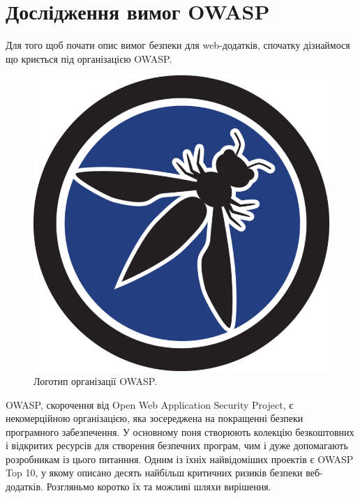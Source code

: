 \chapter{Дослідження вимог OWASP}
Для того щоб почати опис вимог безпеки для web-додатків, спочатку дізнаймося що криється під організацією OWASP.

\begin{figure}[!h]
    		\centering
    		\includegraphics[scale = 0.3]{IMAGES/owasp_logo.png}
    		\caption{Логотип організації OWASP.}
    		\label{fig:app_view_main_screen}
	\end{figure}

OWASP, скорочення від Open Web Application Security Project, є некомерційною організацією, яка зосереджена на покращенні безпеки програмного забезпечення. У основному поня створюють колекцію безкоштовних і відкритих ресурсів для створення безпечних програм, чим і дуже допомагають розробникам із цього питанння. Одним із їхніх найвідоміших проектів є OWASP Top 10, у якому описано десять найбільш критичних ризиків безпеки веб-додатків. Розгляньмо коротко їх та можливі шляхи вирішення.

